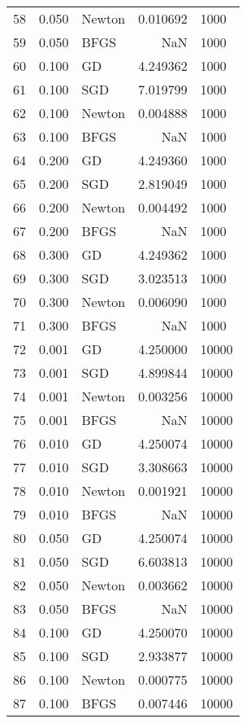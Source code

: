 \begin{tabular}{lrlrl}
58  &  0.050 &  Newton &  0.010692 &     1000 \\
59  &  0.050 &    BFGS &       NaN &     1000 \\
60  &  0.100 &      GD &  4.249362 &     1000 \\
61  &  0.100 &     SGD &  7.019799 &     1000 \\
62  &  0.100 &  Newton &  0.004888 &     1000 \\
63  &  0.100 &    BFGS &       NaN &     1000 \\
64  &  0.200 &      GD &  4.249360 &     1000 \\
65  &  0.200 &     SGD &  2.819049 &     1000 \\
66  &  0.200 &  Newton &  0.004492 &     1000 \\
67  &  0.200 &    BFGS &       NaN &     1000 \\
68  &  0.300 &      GD &  4.249362 &     1000 \\
69  &  0.300 &     SGD &  3.023513 &     1000 \\
70  &  0.300 &  Newton &  0.006090 &     1000 \\
71  &  0.300 &    BFGS &       NaN &     1000 \\
72  &  0.001 &      GD &  4.250000 &    10000 \\
73  &  0.001 &     SGD &  4.899844 &    10000 \\
74  &  0.001 &  Newton &  0.003256 &    10000 \\
75  &  0.001 &    BFGS &       NaN &    10000 \\
76  &  0.010 &      GD &  4.250074 &    10000 \\
77  &  0.010 &     SGD &  3.308663 &    10000 \\
78  &  0.010 &  Newton &  0.001921 &    10000 \\
79  &  0.010 &    BFGS &       NaN &    10000 \\
80  &  0.050 &      GD &  4.250074 &    10000 \\
81  &  0.050 &     SGD &  6.603813 &    10000 \\
82  &  0.050 &  Newton &  0.003662 &    10000 \\
83  &  0.050 &    BFGS &       NaN &    10000 \\
84  &  0.100 &      GD &  4.250070 &    10000 \\
85  &  0.100 &     SGD &  2.933877 &    10000 \\
86  &  0.100 &  Newton &  0.000775 &    10000 \\
87  &  0.100 &    BFGS &  0.007446 &    10000 \\

\end{tabular}
